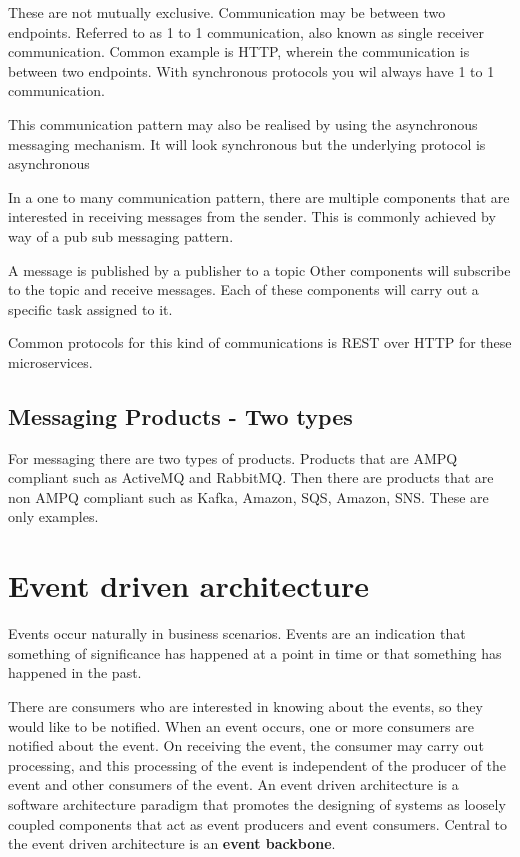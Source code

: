 These are not mutually exclusive.
Communication may be between two endpoints.
Referred to as 1 to 1 communication, also known as single receiver communication.
Common example is HTTP, wherein the communication is between two endpoints.
With synchronous protocols you wil always have 1 to 1 communication.

This communication pattern may also be realised by using the asynchronous messaging mechanism.
It will look synchronous but the underlying protocol is asynchronous

In a one to many communication pattern, there are multiple components that are interested in receiving messages from the sender.
This is commonly achieved by way of a pub sub messaging pattern.
\begin{list}
    \list A message is published by a publisher to a topic
    \list Other components will subscribe to the topic and receive messages.
    \list Each of these components will carry out a specific task assigned to it.
\end{list}

Common protocols for this kind of communications is REST over HTTP for these microservices.

\subsection{Messaging Products - Two types}
For messaging there are two types of products.
Products that are AMPQ compliant such as ActiveMQ and RabbitMQ.
Then there are products that are non AMPQ compliant such as Kafka, Amazon, SQS, Amazon, SNS. These are only examples.



\section{Event driven architecture}
Events occur naturally in business scenarios.
Events are an indication that something of significance has happened at a point in time or that something has happened in the past.

There are consumers who are interested in knowing about the events, so they would like to be notified.
When an event occurs, one or more consumers are notified about the event.
On receiving the event, the consumer may carry out processing, and this processing of the event is independent of the producer of the event and other consumers of the event.
An event driven architecture is a software architecture paradigm that promotes the designing of systems as loosely coupled components that act as event producers and event consumers.
Central to the event driven architecture is an \textbf{event backbone}.

